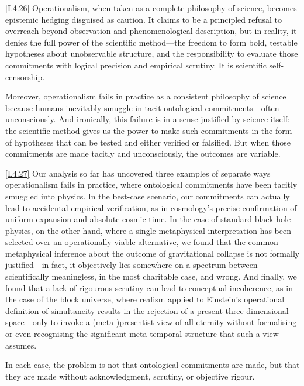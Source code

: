\documentclass[12pt]{book}
\newcounter{logicanchor}
\newenvironment{logicanchorenv}[1]{\refstepcounter{logicanchor}\label{#1}}{}
\newcommand{\logiclink}[2]{\begin{logicanchorenv}{logic:#1}\end{logicanchorenv}\hyperref[appendix:#1]{[#1]}\xspace}
\begin{document}
\vspace{4pt}

\logiclink{L4.26}{} Operationalism, when taken as a complete philosophy of science, becomes epistemic hedging disguised as caution. It claims to be a principled refusal to overreach beyond observation and phenomenological description, but in reality, it denies the full power of the scientific method---the freedom to form bold, testable hypotheses about unobservable structure, and the responsibility to evaluate those commitments with logical precision and empirical scrutiny. It is scientific self-censorship.

Moreover, operationalism fails in practice as a consistent philosophy of science because humans inevitably smuggle in tacit ontological commitments---often unconsciously. And ironically, this failure is in a sense justified by science itself: the scientific method gives us the power to make such commitments in the form of hypotheses that can be tested and either verified or falsified. But when those commitments are made tacitly and unconsciously, the outcomes are variable. 

\logiclink{L4.27}{} Our analysis so far has uncovered three examples of separate ways operationalism fails in practice, where ontological commitments have been tacitly smuggled into physics. In the best-case scenario, our commitments can actually lead to accidental empirical verification, as in cosmology's precise confirmation of uniform expansion and absolute cosmic time. In the case of standard black hole physics, on the other hand, where a single metaphysical interpretation has been selected over an operationally viable alternative, we found that the common metaphysical inference about the outcome of gravitational collapse is not formally justified---in fact, it objectively lies somewhere on a spectrum between scientifically meaningless, in the most charitable case, and wrong. And finally, we found that a lack of rigourous scrutiny can lead to conceptual incoherence, as in the case of the block universe, where realism applied to Einstein's operational definition of simultaneity results in the rejection of a present three-dimensional space---only to invoke a (meta-)presentist view of all eternity without formalising or even recognising the significant meta-temporal structure that such a view assumes.

In each case, the problem is not that ontological commitments are made, but that they are made without acknowledgment, scrutiny, or objective rigour.
\end{document}
